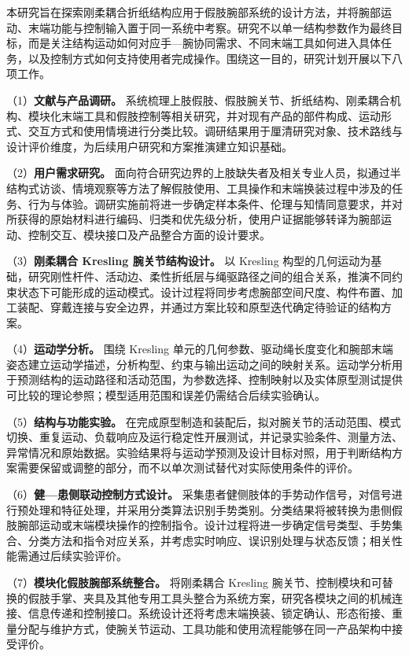 本研究旨在探索刚柔耦合折纸结构应用于假肢腕部系统的设计方法，并将腕部运动、末端功能与控制输入置于同一系统中考察。研究不以单一结构参数作为最终目标，而是关注结构运动如何对应手—腕协同需求、不同末端工具如何进入具体任务，以及控制方式如何支持使用者完成操作。围绕这一目的，研究计划开展以下八项工作。

（1）\textbf{文献与产品调研。} 系统梳理上肢假肢、假肢腕关节、折纸结构、刚柔耦合机构、模块化末端工具和假肢控制等相关研究，并对现有产品的部件构成、运动形式、交互方式和使用情境进行分类比较。调研结果用于厘清研究对象、技术路线与设计评价维度，为后续用户研究和方案推演建立知识基础。

（2）\textbf{用户需求研究。} 面向符合研究边界的上肢缺失者及相关专业人员，拟通过半结构式访谈、情境观察等方法了解假肢使用、工具操作和末端换装过程中涉及的任务、行为与体验。调研实施前将进一步确定样本条件、伦理与知情同意要求，并对所获得的原始材料进行编码、归类和优先级分析，使用户证据能够转译为腕部运动、控制交互、模块接口及产品整合方面的设计要求。

（3）\textbf{刚柔耦合 Kresling 腕关节结构设计。} 以 Kresling 构型的几何运动为基础，研究刚性杆件、活动边、柔性折纸层与绳驱路径之间的组合关系，推演不同约束状态下可能形成的运动模式。设计过程将同步考虑腕部空间尺度、构件布置、加工装配、穿戴连接与安全边界，并通过方案比较和原型迭代确定待验证的结构方案。

（4）\textbf{运动学分析。} 围绕 Kresling 单元的几何参数、驱动绳长度变化和腕部末端姿态建立运动学描述，分析构型、约束与输出运动之间的映射关系。运动学分析用于预测结构的运动路径和活动范围，为参数选择、控制映射以及实体原型测试提供可比较的理论参照；模型适用范围和误差仍需结合后续实验确认。

（5）\textbf{结构与功能实验。} 在完成原型制造和装配后，拟对腕关节的活动范围、模式切换、重复运动、负载响应及运行稳定性开展测试，并记录实验条件、测量方法、异常情况和原始数据。实验结果将与运动学预测及设计目标对照，用于判断结构方案需要保留或调整的部分，而不以单次测试替代对实际使用条件的评价。

（6）\textbf{健—患侧联动控制方式设计。} 采集患者健侧肢体的手势动作信号，对信号进行预处理和特征处理，并采用分类算法识别手势类别。分类结果将被转换为患侧假肢腕部运动或末端模块操作的控制指令。设计过程将进一步确定信号类型、手势集合、分类方法和指令对应关系，并考虑实时响应、误识别处理与状态反馈；相关性能需通过后续实验评价。

（7）\textbf{模块化假肢腕部系统整合。} 将刚柔耦合 Kresling 腕关节、控制模块和可替换的假肢手掌、夹具及其他专用工具头整合为系统方案，研究各模块之间的机械连接、信息传递和控制接口。系统设计还将考虑末端换装、锁定确认、形态衔接、重量分配与维护方式，使腕关节运动、工具功能和使用流程能够在同一产品架构中接受评价。

